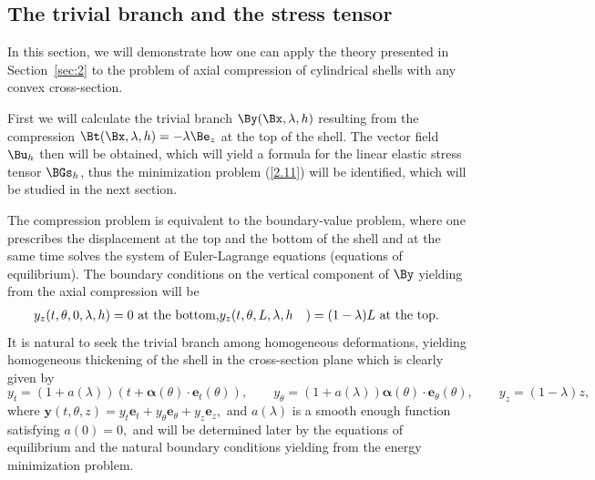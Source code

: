 \subsection{The trivial branch and the stress tensor}
\setcounter{equation}{0}
\label{sec:4.1}


In this section, we will demonstrate how one can apply the theory presented in Section~\ref{sec:2} to the problem of axial compression of cylindrical shells with any convex cross-section.

First we will calculate the trivial branch $\By(\Bx,\lambda,h)$ resulting from the compression $\Bt(\Bx,\lambda,h)=-\lambda \Be_z$
at the top of the shell. The vector field $\Bu_h$ then will be obtained, which will yield a formula for the linear elastic stress tensor $\BGs_h$, thus the minimization problem (\ref{2.11}) will be identified, which will be studied in the next section. 

The compression problem is equivalent to the boundary-value problem, where one prescribes the displacement at the top and the bottom of the shell and at the same time solves the system of Euler-Lagrange equations (equations of equilibrium). The boundary conditions on the vertical component of $\By$ yielding from the axial compression will be 
\begin{align*}
  y_z(t,\theta,0,\lambda,h)&=0\text{ at the bottom,}
  y_z(t,\theta,L,\lambda,h&)=(1-\lambda)L\text{ at the top.}
\end{align*}
 It is natural to seek the trivial branch among homogeneous deformations, yielding homogeneous thickening of the shell in the cross-section plane which is clearly given by 
\begin{equation}
\label{4.1}
y_t=(1+a(\lambda))(t+\bm\alpha(\theta)\cdot \bm e_t(\theta)), \qquad y_\theta=(1+a(\lambda))\bm\alpha(\theta)\cdot \bm e_\theta(\theta), \qquad y_z=(1-\lambda)z, 
\end{equation}
where $\bm y(t,\theta,z)=y_t \bm e_t+y_\theta \bm e_\theta+y_z\bm e_z,$ and $a(\lambda)$ is a smooth enough function satisfying $a(0)=0,$ and will be determined later by the equations of equilibrium and the natural boundary conditions yielding from the energy minimization problem.


